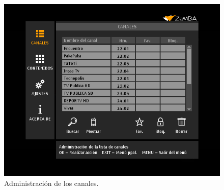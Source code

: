 \documentclass{article}
\begin{document}
\begin{figure}[h]
 \centerline{\includegraphics[scale=0.50,keepaspectratio=true]{canales}}
 \caption{Administración de los canales.}
\end{figure}
\pagebreak
\end{document}
